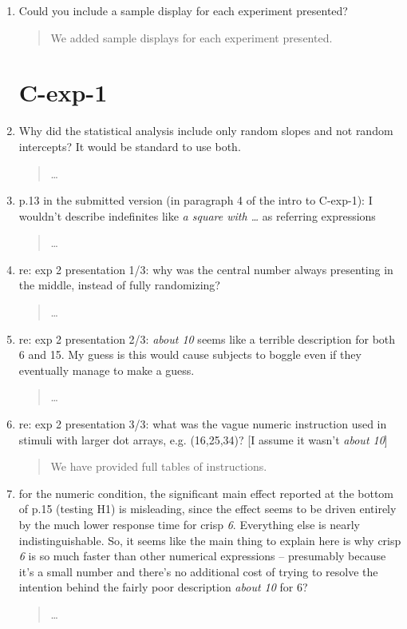 \documentclass{tufte-handout}
\begin{document}
\begin{enumerate}
\item Could you include a sample display for each experiment presented?
\begin{quote}We added sample displays for each experiment presented.\end{quote}

\section{C-exp-1}

\item Why did the statistical analysis include only random slopes and not random intercepts? It would be standard to use both.
\begin{quote}\ldots\end{quote}

\item p.13 in the submitted version (in paragraph 4 of the intro to C-exp-1): I wouldn't describe indefinites like \emph{a square with \ldots} as referring expressions
\begin{quote}\ldots\end{quote}

\item re: exp 2 presentation 1/3: why was the central number always presenting in the middle, instead of fully randomizing?
\begin{quote}\ldots\end{quote}

\item re: exp 2 presentation 2/3: \emph{about 10} seems like a terrible description for both 6 and 15. My guess is this would cause subjects to boggle even if they eventually manage to make a guess.
\begin{quote}\ldots\end{quote}

\item re: exp 2 presentation 3/3: what was the vague numeric instruction used in stimuli with larger dot arrays, e.g. (16,25,34)? [I assume it wasn't \emph{about 10}]
\begin{quote}We have provided full tables of instructions.\end{quote}

\item for the numeric condition, the significant main effect reported at the bottom of p.15 (testing H1) is misleading, since the effect seems to be driven entirely by the much lower response time for crisp \emph{6}. Everything else is nearly indistinguishable. So, it seems like the main thing to explain here is why crisp \emph{6} is so much faster than other numerical expressions -- presumably because it's a small number and there's no additional cost of trying to resolve the intention behind the fairly poor description \emph{about 10} for 6?
\begin{quote}\ldots\end{quote}


\end{enumerate}
\end{document}
